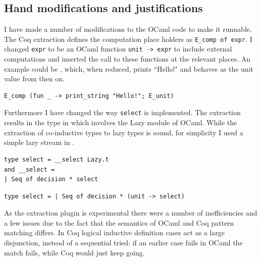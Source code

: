 \documentclass[12pt,twoside,notitlepage]{report}
\theoremstyle{plain}%
\theoremstyle{definition}
\theoremstyle{remark}
\begin{document}
\subsection{Hand modifications and justifications}
I have made a number of modifications to the OCaml code to make it runnable. The Coq extraction defines the computation place holders as \lstinline|E_comp of expr|. I changed \lstinline|expr| to be an OCaml function \lstinline|unit -> expr| to include external computations and inserted the call to these functions at the relevant places. An example could be , which, when reduced, prints ``Hello!" and behaves as the unit value from then on. 
\begin{lstlisting}[caption={OCaml computation placeholder example}, label={lst:ocaml_comp_place2}]
E_comp (fun _ -> print_string "Hello!"; E_unit)
\end{lstlisting}

Furthermore I have changed the way \verb|select| is implemented. The extraction results in the type in  which involves the Lazy module of OCaml. While the extraction of co-inductive types to lazy types is sound, for simplicity I used a simple lazy stream in . 


\vspace{3mm}
\begin{minipage}{\linewidth}

\begin{lstlisting}[caption={OCaml lazy select}, label={lst:ocamllazystar}]
type select = __select Lazy.t
and __select =
| Seq of decision * select
\end{lstlisting}

\end{minipage}

\begin{minipage}{\linewidth}

\begin{lstlisting}[caption={OCaml stream select}, label={lst:ocamlstreamstar}]
type select = | Seq of decision * (unit -> select) 
\end{lstlisting}

\end{minipage}

As the extraction plugin is experimental there were a number of inefficiencies and a few issues due to the fact that the semantics of OCaml and Coq pattern matching differs. In Coq logical inductive definition cases act as a large disjunction, instead of a sequential tried: if an earlier case fails in OCaml the match fails, while Coq would just keep going.
\end{document}
